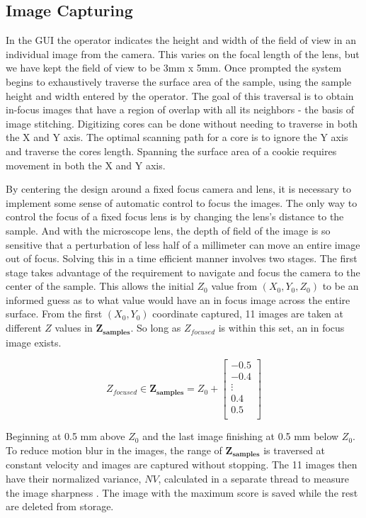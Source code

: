 \documentclass[a4paper,12pt]{article}
\begin{document}
\subsection{Image Capturing}
In the GUI the operator indicates the height and width of the field of view in an individual image from the camera. 
This varies on the focal length of the lens, but we have kept the field of view to be 3mm x 5mm. 
Once prompted the system begins to exhaustively traverse the surface area of the sample, using the sample height and width entered by the operator.  
The goal of this traversal is to obtain in-focus images that have a region of overlap with all its neighbors - the basis of image stitching. 
Digitizing cores can be done without needing to traverse in both the X and Y axis. 
The optimal scanning path for a core is to ignore the Y axis and traverse the cores length.
Spanning the surface area of a cookie requires movement in both the X and Y axis.

By centering the design around a fixed focus camera and lens, it is necessary to implement some sense of automatic control to focus the images. 
The only way to control the focus of a fixed focus lens is by changing the lens's distance to the sample. 
And with the microscope lens, the depth of field of the image is so sensitive that a perturbation of less half of a millimeter can move an entire image out of focus.
Solving this in a time efficient manner involves two stages. 
The first stage takes advantage of the requirement to navigate and focus the camera to the center of the sample.
This allows the initial $Z_0$ value from $(X_0, Y_0, Z_0)$ to be an informed guess as to what value would have an in focus image across the entire surface. 
From the first $(X_0, Y_0)$ coordinate captured, 11 images are taken at different $Z$ values in $\boldsymbol{Z_{\text{samples}}}$. 
So long as $Z_{focused}$ is within this set, an in focus image exists.

\[
Z_{focused} \in
\boldsymbol{Z_{\text{samples}}} = 
Z_0 + 
\begin{bmatrix}
-0.5 \\
-0.4 \\
\vdots \\
0.4 \\
0.5 \\
\end{bmatrix}
\] %

Beginning at 0.5 mm above $Z_0$ and the last image finishing at 0.5 mm below $Z_0$.
To reduce motion blur in the images, the range of $\boldsymbol{Z_{\text{samples}}}$ is traversed at constant velocity and images are captured without stopping. 
The 11 images then have their normalized variance, $NV$, calculated in a separate thread to measure the image sharpness \citep{sampat_extensive_2014}.
The image with the maximum score is saved while the rest are deleted from storage.
\end{document}

